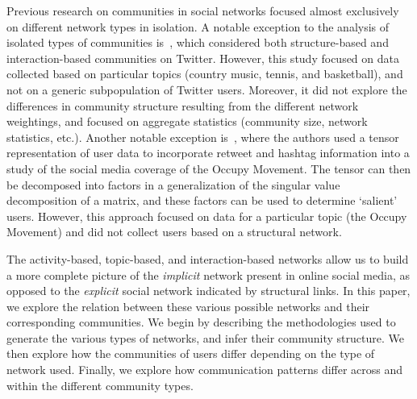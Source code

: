 Previous research on communities in social networks focused almost exclusively on different network types in isolation.
A notable exception to the analysis of isolated types of communities is~\cite{lim2012tweets}, which considered both structure-based and interaction-based communities on Twitter. However, this study focused on data collected based on particular topics (country music, tennis, and basketball), and not on a generic subpopulation of Twitter users. Moreover, it did not explore the differences in community structure resulting from the different network weightings, and focused on aggregate statistics (community size, network statistics, etc.). Another notable exception is~\cite{kao2013talison}, where the authors used a tensor representation of user data to incorporate retweet and hashtag information into a study of the social media coverage of the Occupy Movement. The tensor can then be decomposed into factors in a generalization of the singular value decomposition of a matrix, and these factors can be used to determine `salient' users. However, this approach focused on data for a particular topic (the Occupy Movement) and did not collect users based on a structural network.

The activity-based, topic-based, and interaction-based networks allow us to build a more complete picture of the \emph{implicit} network present in online social media, as opposed to the \emph{explicit} social network indicated by structural links. In this paper, we explore the relation between these various possible networks and their corresponding communities. We begin by describing the methodologies used to generate the various types of networks, and infer their community structure. We then explore how the communities of users differ depending on the type of network used. Finally, we explore how communication patterns differ across and within the different community types.





